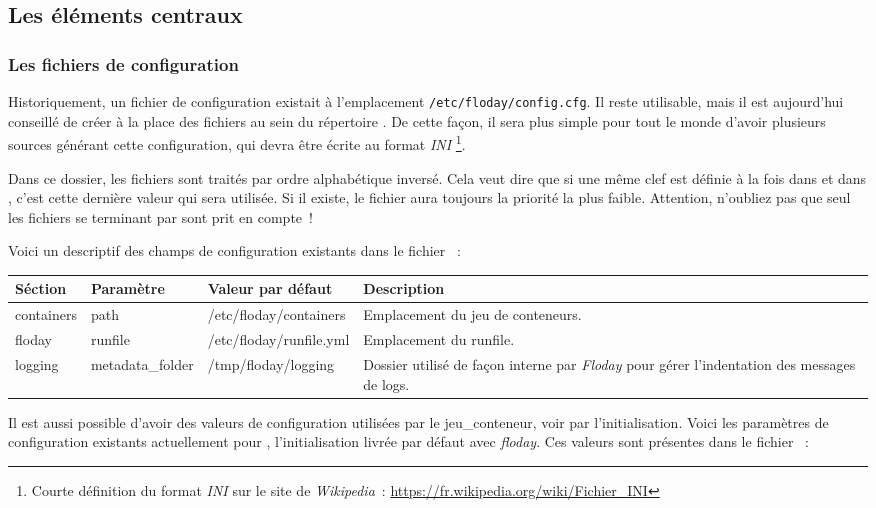 \subsection{Les éléments centraux}

\subsubsection{Les fichiers de configuration}
Historiquement, un fichier de configuration existait à l'emplacement {\tt/etc/floday/config.cfg}.
Il reste utilisable, mais il est aujourd'hui conseillé de créer à la place des fichiers  au sein du répertoire .
De cette façon, il sera plus simple pour tout le monde d'avoir plusieurs sources générant cette configuration, qui devra être écrite au format \emph{INI}%
\footnote{Courte définition du format \emph{INI} sur le site de \emph{Wikipedia}~:
	\url{https://fr.wikipedia.org/wiki/Fichier_INI}
}.

Dans ce dossier, les fichiers sont traités par ordre alphabétique inversé.
Cela veut dire que si une même clef  est définie à la fois dans  et dans , c'est cette dernière valeur qui sera utilisée.
Si il existe, le fichier  aura toujours la priorité la plus faible.
Attention, n'oubliez pas que seul les fichiers se terminant par  sont prit en compte~!

Voici un descriptif des champs de configuration existants dans le fichier ~:
\newline

\begin{tabular}{|l|l|p{4cm}|p{4.1cm}|}
	\hline
	Séction & Paramètre & Valeur par défaut & Description \\
	\hline
	containers & path & /etc/floday/containers & Emplacement du jeu de conteneurs.\\
	floday & runfile & /etc/floday/runfile.yml & Emplacement du \gls{runfile}. \\
	logging & metadata\_folder & /tmp/floday/logging & Dossier utilisé de façon interne par \emph{Floday} pour gérer l'indentation des messages de logs. \\
	\hline
\end{tabular}
\newline

Il est aussi possible d'avoir des valeurs de configuration utilisées par le \gls{jeu_conteneur}, voir par l'\gls{initialisation}.
Voici les paramètres de configuration existants actuellement pour , l'initialisation livrée par défaut avec \emph{floday}. Ces valeurs sont présentes dans le fichier ~:
\newline

